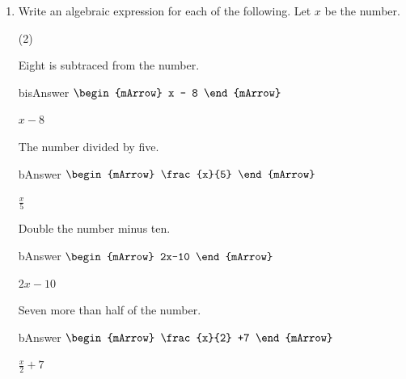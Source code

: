 \begin{enumerate}[resume]
  \item Write an algebraic expression for each of the following. Let $x$ be the number.
  \begin{subtask}(2)
    \task[] \begin{exercise} Eight is subtraced from the number.
               \begin{envOut}[height=3cm]{bisAnswer}
			       $\begin{mArrow}
			                x - 8	   
	                \end{mArrow}$
               \end{envOut}			  
			  \begin{shortsolution}  
				       $x-8$
			  \end{shortsolution}
		    \end{exercise}

    \task[] \begin{exercise} The number divided by five.
               \begin{envOut}[height=3cm]{bAnswer}
			       $\begin{mArrow}
			                \frac{x}{5}	   
	                \end{mArrow}$
               \end{envOut}			  
			  \begin{shortsolution}  
				       $\frac{x}{5}$
			  \end{shortsolution}
		    \end{exercise}

    \task[] \begin{exercise} Double the number minus ten.
               \begin{envOut}[height=3cm]{bAnswer}
			       $\begin{mArrow}
			                2x-10	   
	                \end{mArrow}$
               \end{envOut}			  
			  \begin{shortsolution}  
				       $2x-10$
			  \end{shortsolution}
		    \end{exercise}
			
    \task[] \begin{exercise} Seven more than half of the number.
               \begin{envOut}[height=3cm]{bAnswer}
			       $\begin{mArrow}
			                \frac{x}{2} +7	   
	                \end{mArrow}$
               \end{envOut}			  
			  \begin{shortsolution}  
				       $\frac{x}{2} +7$
			  \end{shortsolution}
		    \end{exercise}

   \end{subtask} 
\end{enumerate}
